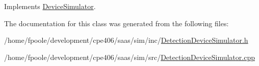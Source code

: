 Implements \hyperlink{class_device_simulator_a2c63437b2c443a7c1e7dcda80c5efe77}{Device\+Simulator}.



The documentation for this class was generated from the following files\+:\begin{DoxyCompactItemize}
\item 
/home/fpoole/development/cpe406/saas/sim/inc/\hyperlink{_detection_device_simulator_8h}{Detection\+Device\+Simulator.\+h}\item 
/home/fpoole/development/cpe406/saas/sim/src/\hyperlink{_detection_device_simulator_8cpp}{Detection\+Device\+Simulator.\+cpp}\end{DoxyCompactItemize}
